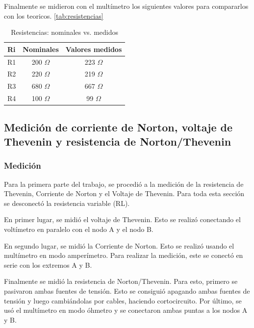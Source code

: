 \documentclass{article}
\begin{document}
        Finalmente se midieron con el multímetro los siguientes valores para compararlos con los teoricos. \autoref{tab:resistencias}\par
        
        \begin{table}[h!]
            \centering
            \begin{tabular}{|l|c|c|}
            \hline
            Ri & \multicolumn{1}{l|}{Nominales} & \multicolumn{1}{l|}{Valores medidos} \\ \hline
            R1 & 200  $ \Omega $       & 223     $ \Omega $       \\ \hline
            R2 & 220  $ \Omega $       & 219 $ \Omega $           \\ \hline
            R3 & 680  $ \Omega $       & 667 $ \Omega $           \\ \hline
            R4 & 100  $ \Omega $      & 99 $ \Omega $              \\ \hline
            \end{tabular}
            \caption{Resistencias: nominales vs. medidos}
            \label{tab:resistencias}
        \end{table}

        \subsection{Medición de corriente de Norton, voltaje de Thevenin y resistencia de Norton/Thevenin}
            \subsubsection{Medición}
                \quad Para la primera parte del trabajo, se procedió a la medición de la resistencia de Thevenin, Corriente de Norton y el Voltaje de Thevenin. Para toda esta sección se desconectó la resistencia variable (RL).\par
                En primer lugar, se midió el voltaje de Thevenin. Esto se realizó conectando el voltímetro en paralelo con el nodo A y el nodo B.\par
                En segundo lugar, se midió la Corriente de Norton. Esto se realizó usando el multímetro en modo amperímetro. Para realizar la medición, este se conectó en serie con los extremos A y B. \par
                Finalmente se midió la resistencia de Norton/Thevenin. Para esto, primero se  pasivaron ambas fuentes de tensión. Esto se consiguió apagando ambas fuentes de tensión y luego cambiándolas por cables, haciendo cortocircuito. Por último, se usó el multímetro en modo óhmetro y se conectaron ambas puntas a los nodos A y B.\par
\end{document}
